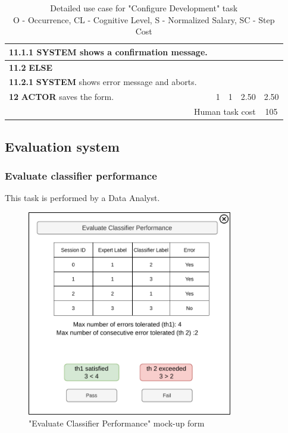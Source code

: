 \begin{table}[H]
\begin{tabularx}{\textwidth}{|X|c|c|c|c|}
    \hline
    \textbf{11.1.1} \textbf{SYSTEM} shows a confirmation message. & & & & \\
    \hline
    \textbf{11.2} \textbf{ELSE} & & & & \\
    \hline
    \textbf{11.2.1} \textbf{SYSTEM} shows error message and aborts. & & & & \\
    \hline
    \textbf{12} \textbf{ACTOR} saves the form. & 1 & 1 & 2.50 & 2.50 \\
    \hline
    \multicolumn{4}{|r|}{Human task cost} & 105 \\
    \hline
    \end{tabularx}
    \caption{Detailed use case for "Configure Development" task\\ 
    O - Occurrence, CL - Cognitive Level, S - Normalized Salary, SC - Step Cost}
    \label{table:configure_development_system}
    \end{table}
\subsection{Evaluation system}

\subsubsection{Evaluate classifier performance}

This task is performed by a Data Analyst.

\begin{figure}[H]
\centering
\includegraphics[width=0.8\textwidth]{figures/evaluate_classifier_performance.pdf}
\caption{"Evaluate Classifier Performance" mock-up form}
\end{figure}

